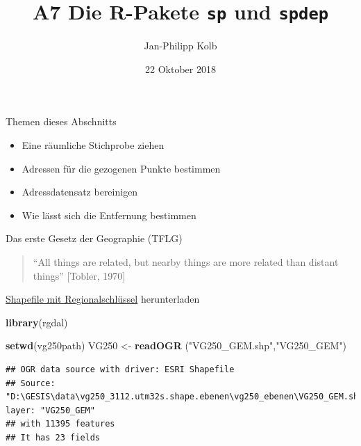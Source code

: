 \documentclass[ignorenonframetext,]{beamer}
\title{A7 Die R-Pakete \texttt{sp} und \texttt{spdep}}
\author{Jan-Philipp Kolb}
\date{22 Oktober 2018}
\newenvironment{Shaded}{\begin{snugshade}}{\end{snugshade}}
\newcommand{\KeywordTok}[1]{\textcolor[rgb]{0.26,0.66,0.93}{\textbf{#1}}}
\newcommand{\NormalTok}[1]{\textcolor[rgb]{0.74,0.68,0.62}{#1}}
\newcommand{\StringTok}[1]{\textcolor[rgb]{0.02,0.61,0.04}{#1}}
\providecommand{\tightlist}{%
  \setlength{\itemsep}{0pt}\setlength{\parskip}{0pt}}
\begin{document}
\frame{\titlepage}

\begin{frame}{Themen dieses Abschnitts}
\protect\hypertarget{themen-dieses-abschnitts}{}

\begin{itemize}
\tightlist
\item
  Eine räumliche Stichprobe ziehen
\item
  Adressen für die gezogenen Punkte bestimmen
\item
  Adressdatensatz bereinigen
\item
  Wie lässt sich die Entfernung bestimmen
\end{itemize}

\begin{block}{Das erste Gesetz der Geographie (TFLG)}

\begin{quote}
``All things are related, but nearby things are more related than
distant things'' {[}Tobler, 1970{]}
\end{quote}

\end{block}

\end{frame}

\begin{frame}[fragile]{\href{http://www.geodatenzentrum.de/geodaten/gdz_rahmen.gdz_div?gdz_spr=deu\&gdz_akt_zeile=5\&gdz_anz_zeile=1\&gdz_unt_zeile=13\&gdz_user_id=0}{Shapefile
mit Regionalschlüssel} herunterladen}
\protect\hypertarget{shapefile-mit-regionalschlussel-herunterladen}{}

\begin{Shaded}
\begin{Highlighting}[]
\KeywordTok{library}\NormalTok{(rgdal)}
\end{Highlighting}
\end{Shaded}

\begin{Shaded}
\begin{Highlighting}[]
\KeywordTok{setwd}\NormalTok{(vg250path)}
\NormalTok{VG250 <-}\StringTok{ }\KeywordTok{readOGR}\NormalTok{ (}\StringTok{"VG250_GEM.shp"}\NormalTok{,}\StringTok{"VG250_GEM"}\NormalTok{)}
\end{Highlighting}
\end{Shaded}

\begin{verbatim}
## OGR data source with driver: ESRI Shapefile 
## Source: "D:\GESIS\data\vg250_3112.utm32s.shape.ebenen\vg250_ebenen\VG250_GEM.shp", layer: "VG250_GEM"
## with 11395 features
## It has 23 fields
\end{verbatim}

\end{frame}
\end{document}
